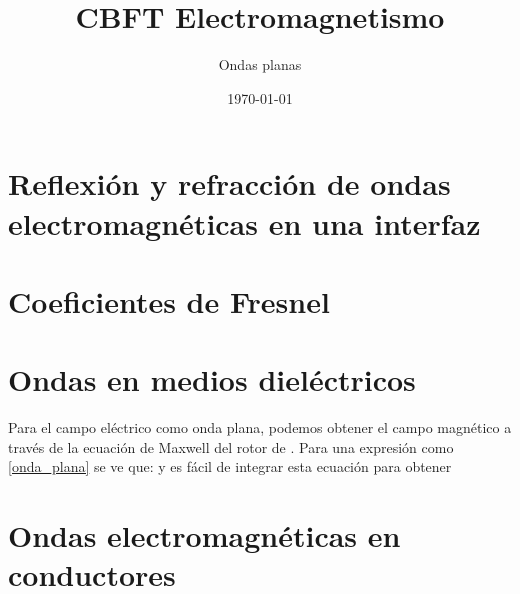 \documentclass[10pt,oneside]{CBFT_article}
\title{CBFT Electromagnetismo}
\author{Ondas planas}
\date{\today}
\begin{document}
\maketitle
\tableofcontents


\section{Reflexión y refracción de ondas electromagnéticas en una interfaz}

 
\section{Coeficientes de Fresnel}


\section{Ondas en medios dieléctricos}

Para el campo eléctrico como onda plana,
podemos obtener el campo magnético  a través de la ecuación de Maxwell del rotor
de . Para una expresión como \eqref{onda_plana} se ve que:
y es fácil de integrar esta ecuación para obtener

\section{Ondas electromagnéticas en conductores}
\end{document}
